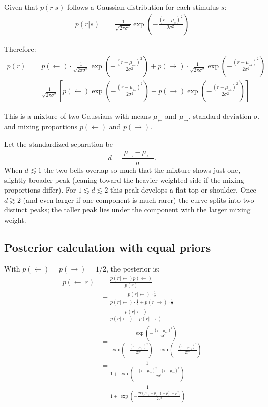 \documentclass{article}
\begin{document}
Given that $p(r|s)$ follows a Gaussian distribution for each stimulus $s$:
\begin{align}
p(r|s) &= \frac{1}{\sqrt{2\pi\sigma^2}} \exp\left(-\frac{(r - \mu_s)^2}{2\sigma^2}\right)
\end{align}

Therefore:
\begin{align}
p(r) &= p(\leftarrow) \cdot \frac{1}{\sqrt{2\pi\sigma^2}} \exp\left(-\frac{(r - \mu_\leftarrow)^2}{2\sigma^2}\right) + p(\rightarrow) \cdot \frac{1}{\sqrt{2\pi\sigma^2}} \exp\left(-\frac{(r - \mu_\rightarrow)^2}{2\sigma^2}\right) \\
&= \frac{1}{\sqrt{2\pi\sigma^2}} \left[ p(\leftarrow) \exp\left(-\frac{(r - \mu_\leftarrow)^2}{2\sigma^2}\right) + p(\rightarrow) \exp\left(-\frac{(r - \mu_\rightarrow)^2}{2\sigma^2}\right) \right]
\end{align}

This is a mixture of two Gaussians with means $\mu_\leftarrow$ and $\mu_\rightarrow$, standard deviation $\sigma$, and mixing proportions $p(\leftarrow)$ and $p(\rightarrow)$.

Let the standardized separation be
\[
d=\frac{\lvert\mu_{\rightarrow}-\mu_{\leftarrow}\rvert}{\sigma}.
\]
When \(d\lesssim 1\) the two bells overlap so much that the mixture shows just one, slightly broader peak (leaning toward the heavier‐weighted side if the mixing proportions differ).  
For \(1\lesssim d\lesssim 2\) this peak develops a flat top or shoulder.  
Once \(d\gtrsim 2\) (and even larger if one component is much rarer) the curve splits into two distinct peaks; the taller peak lies under the component with the larger mixing weight.


\subsection{Posterior calculation with equal priors}
With $p(\leftarrow) = p(\rightarrow) = 1/2$, the posterior is:
\begin{align}
p(\leftarrow|r) &= \frac{p(r|\leftarrow)p(\leftarrow)}{p(r)} \\
&= \frac{p(r|\leftarrow) \cdot \frac{1}{2}}{p(r|\leftarrow) \cdot \frac{1}{2} + p(r|\rightarrow) \cdot \frac{1}{2}} \\
&= \frac{p(r|\leftarrow)}{p(r|\leftarrow) + p(r|\rightarrow)} \\
&= \frac{\exp\left(-\frac{(r - \mu_\leftarrow)^2}{2\sigma^2}\right)}{\exp\left(-\frac{(r - \mu_\leftarrow)^2}{2\sigma^2}\right) + \exp\left(-\frac{(r - \mu_\rightarrow)^2}{2\sigma^2}\right)} \\
&= \frac{1}{1 + \exp\left(-\frac{(r - \mu_\leftarrow)^2 - (r - \mu_\rightarrow)^2}{2\sigma^2}\right)} \\
&= \frac{1}{1 + \exp\left(-\frac{2r(\mu_\rightarrow - \mu_\leftarrow) + \mu_\leftarrow^2 - \mu_\rightarrow^2}{2\sigma^2}\right)}
\end{align}
\end{document}
